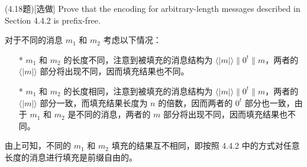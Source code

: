 \begin{questions}
    \question (4.18题)[选做] Prove that the encoding for arbitrary-length messages described in Section 4.4.2 is prefix-free.

        \begin{solution}
            \newline
            对于不同的消息 $m_1$ 和 $m_2$ 考虑以下情况：
            \begin{enumerate}
                \item[*] $m_1$ 和 $m_2$ 的长度不同，注意到被填充的消息结构为 $\langle|m|\rangle\parallel0^t\parallel{m}$，两者的 $\langle|m|\rangle$ 部分将出现不同，因而填充结果也不同。
                \item[*] $m_1$ 和 $m_2$ 的长度相同，注意到被填充的消息结构为 $\langle|m|\rangle\parallel0^t\parallel{m}$，两者的 $\langle|m|\rangle$ 部分一致，而填充结果长度为 $n$ 的倍数，因而两者的 $0^t$ 部分也一致，由于 $m_1$ 和 $m_2$ 是不同的消息，两者的 $m$ 部分将出现不同，因而填充结果也不同。
            \end{enumerate}
            由上可知，不同的 $m_1$ 和 $m_2$ 填充的结果互不相同，即按照 4.4.2 中的方式对任意长度的消息进行填充是前缀自由的。
        \end{solution}

\end{questions}



